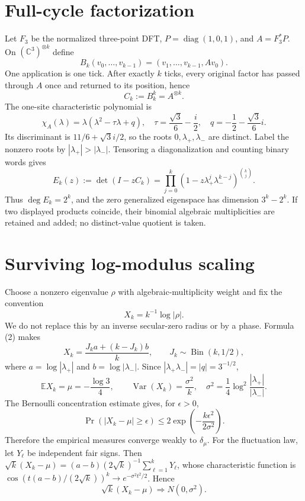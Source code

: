 \documentclass[10pt]{article}
\begin{document}
\section{Full-cycle factorization}
Let $F_3$ be the normalized three-point DFT,
$P=\operatorname{diag}(1,0,1)$, and $A=F_3^*P$.  On
$({\mathbb C}^3)^{\otimes k}$ define
\[
B_k(v_0,\ldots,v_{k-1})=(v_1,\ldots,v_{k-1},Av_0).
\]
One application is one tick.  After exactly $k$ ticks, every original factor
has passed through $A$ once and returned to its position, hence
\begin{equation}
C_k:=B_k^k=A^{\otimes k}.                          \tag{1}
\end{equation}
The one-site characteristic polynomial is
\[
\chi_A(\lambda)=\lambda(\lambda^2-\tau\lambda+q),\quad
\tau=\frac{\sqrt3}{6}-\frac i2,\quad
q=-\frac12-\frac{\sqrt3}{6}i.
\]
Its discriminant is $11/6+\sqrt3 i/2$, so the roots
$0,\lambda_+,\lambda_-$ are distinct.  Label the nonzero roots by
$|\lambda_+|>|\lambda_-|$.  Tensoring a diagonalization and counting binary
words gives
\begin{equation}
E_k(z):=\det(I-zC_k)=\prod_{j=0}^k
 (1-z\lambda_+^j\lambda_-^{k-j})^{\binom{k}{j}}. \tag{2}
\end{equation}
Thus $\deg E_k=2^k$, and the zero generalized eigenspace has dimension
$3^k-2^k$.  If two displayed products coincide, their binomial algebraic
multiplicities are retained and added; no distinct-value quotient is taken.

\section{Surviving log-modulus scaling}
Choose a nonzero eigenvalue $\rho$ with algebraic-multiplicity weight and fix
the convention
\[
X_k=k^{-1}\log|\rho|.
\]
We do not replace this by an inverse secular-zero radius or by a phase.
Formula (2) makes
\[
X_k=\frac{J_k a+(k-J_k)b}{k},\qquad
J_k\sim\operatorname{Bin}(k,1/2),
\]
where $a=\log|\lambda_+|$ and $b=\log|\lambda_-|$.  Since
$|\lambda_+\lambda_-|=|q|=3^{-1/2}$,
\begin{equation}
{\mathbb E}X_k=\mu=-\frac{\log3}{4},\qquad
\operatorname{Var}(X_k)=\frac{\sigma^2}{k},\quad
\sigma^2=\frac14\log^2\!\frac{|\lambda_+|}{|\lambda_-|}. \tag{3}
\end{equation}
The Bernoulli concentration estimate gives, for $\epsilon>0$,
\begin{equation}
\Pr(|X_k-\mu|\geq\epsilon)
 \leq2\exp\!\left(-\frac{k\epsilon^2}{2\sigma^2}\right). \tag{4}
\end{equation}
Therefore the empirical measures converge weakly to $\delta_\mu$.
For the fluctuation law, let $Y_\ell$ be independent fair signs.  Then
$\sqrt{k}(X_k-\mu)=(a-b)(2\sqrt{k})^{-1}\sum_{\ell=1}^kY_\ell$, whose
characteristic function is
$\cos(t(a-b)/(2\sqrt{k}))^k\to e^{-\sigma^2t^2/2}$.  Hence
\begin{equation}
\sqrt{k}(X_k-\mu)\Longrightarrow N(0,\sigma^2).   \tag{5}
\end{equation}
\end{document}
